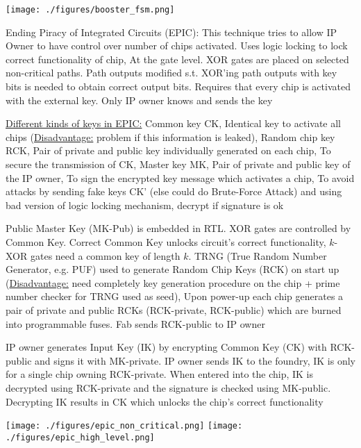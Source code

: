 \documentclass[landscape, a4paper]{article}
\begin{document}
\begin{minipage}[t]{0.2\linewidth}
\begin{betterlist}
\begin{betterlist}
\begin{betterlist}
				\texttt{[image: ./figures/booster\_fsm.png]}
				\item \alert{Ending Piracy of Integrated Circuits (EPIC):} This technique tries to allow IP Owner to have control over number of chips activated. Uses logic locking to lock correct functionality of chip, At the gate level. XOR gates are placed on selected non-critical paths. Path outputs modified s.t. XOR’ing path outputs with key bits is needed to obtain correct output bits. Requires that every chip is activated with the external key. Only IP owner knows and sends the key
				\begin{betterlist}
					\item \underline{Different kinds of keys in EPIC:} \alert{Common key CK}, Identical key to activate all chips \alert{(\underline{Disadvantage:} problem if this information is leaked)}, \alert{Random chip key RCK}, Pair of private and public key individually generated on each chip, \alert{To secure the transmission of CK}, \alert{Master key MK}, Pair of private and public key of the IP owner, To sign the encrypted key message which activates a chip, \alert{To avoid attacks by sending fake keys CK' (else could do Brute-Force Attack) and using bad version of logic locking mechanism, decrypt if signature is ok }
					\item Public Master Key (MK-Pub) is embedded in RTL. XOR gates are controlled by Common Key. Correct Common Key unlocks circuit's correct functionality, $k$-XOR gates need a common key of length $k$. TRNG (True Random Number Generator, e.g. PUF) used to generate Random Chip Keys (RCK) on start up (\alert{\underline{Disadvantage:} need completely key generation procedure on the chip + prime number checker for TRNG used as seed}), Upon power-up each chip generates a pair of private and public RCKs (RCK-private, RCK-public) which are burned into programmable fuses. Fab sends RCK-public to IP owner
					\item IP owner generates Input Key (IK) by encrypting Common Key (CK) with RCK-public and signs it with MK-private. IP owner sends IK to the foundry, IK is only for a single chip owning RCK-private. When entered into the chip, IK is decrypted using RCK-private and the signature is checked using MK-public. Decrypting IK results in CK which unlocks the chip’s correct functionality
				\end{betterlist}
			\end{betterlist}

			\texttt{[image: ./figures/epic\_non\_critical.png]}
			\texttt{[image: ./figures/epic\_high\_level.png]}


\end{betterlist}
\end{betterlist}
\end{minipage}
\end{document}
